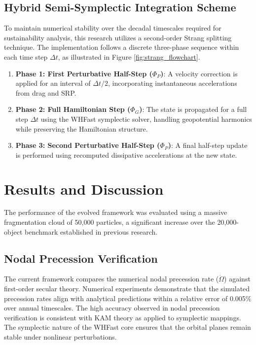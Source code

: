\documentclass[letterpaper, paper,11pt]{AAS}
\begin{document}
\subsection{Hybrid Semi-Symplectic Integration Scheme}
To maintain numerical stability over the decadal timescales required for sustainability analysis, this research utilizes a second-order Strang splitting technique\cite{sanz-serna_symplectic_1992}. The implementation follows a discrete three-phase sequence within each time step $\Delta t$, as illustrated in Figure \ref{fig:strang_flowchart}.
\begin{enumerate}
    \item \textbf{Phase 1: First Perturbative Half-Step ($\Phi_P$)}: A velocity correction is applied for an interval of $\Delta t/2$, incorporating instantaneous accelerations from drag and SRP\cite{sanz-serna_symplectic_1992}.
    \item \textbf{Phase 2: Full Hamiltonian Step ($\Phi_G$)}: The state is propagated for a full step $\Delta t$ using the WHFast symplectic solver, handling geopotential harmonics while preserving the Hamiltonian structure\cite{sanz-serna_symplectic_1992}.
    \item \textbf{Phase 3: Second Perturbative Half-Step ($\Phi_P$)}: A final half-step update is performed using recomputed dissipative accelerations at the new state.
\end{enumerate}

\section{Results and Discussion}
The performance of the evolved framework was evaluated using a massive fragmentation cloud of 50,000 particles, a significant increase over the 20,000-object benchmark established in previous research\cite{puerta-ibarra_advanced_nodate}. 

\subsection{Nodal Precession Verification}
The current framework compares the numerical nodal precession rate ($\dot{\Omega}$) against first-order secular theory. Numerical experiments demonstrate that the simulated precession rates align with analytical predictions within a relative error of 0.005\% over annual timescales. The high accuracy observed in nodal precession verification is consistent with KAM theory as applied to symplectic mappings\cite{sanz-serna_symplectic_1992}. The symplectic nature of the WHFast core ensures that the orbital planes remain stable under nonlinear perturbations\cite{sanz-serna_symplectic_1992}.
\end{document}
